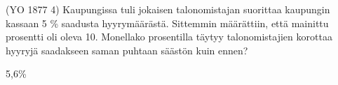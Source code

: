 \begin{tehtava}
(YO 1877 4) Kaupungissa tuli jokaisen talonomistajan suorittaa kaupungin kassaan 5 \% saadusta hyyrymäärästä. Sittemmin määrättiin, että mainittu prosentti oli oleva 10. Monellako prosentilla täytyy talonomistajien korottaa hyyryjä saadakseen saman puhtaan säästön kuin ennen? 
    \begin{vastaus}
5,6\%
    \end{vastaus}
\end{tehtava}